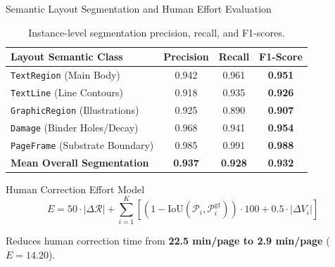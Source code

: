 \documentclass[aspectratio=169]{beamer}
\begin{document}
\begin{frame}{Semantic Layout Segmentation and Human Effort Evaluation}

\begin{table}
  \centering
  \small
  \setlength{\tabcolsep}{5pt}
  \begin{tabular}{lccc}
    \toprule
    \textbf{Layout Semantic Class} & \textbf{Precision} & \textbf{Recall} & \textbf{F1-Score} \\
    \midrule
    \texttt{TextRegion} (Main Body) & 0.942 & 0.961 & \textbf{0.951} \\
    \texttt{TextLine} (Line Contours) & 0.918 & 0.935 & \textbf{0.926} \\
    \texttt{GraphicRegion} (Illustrations) & 0.925 & 0.890 & \textbf{0.907} \\
    \texttt{Damage} (Binder Holes/Decay) & 0.968 & 0.941 & \textbf{0.954} \\
    \texttt{PageFrame} (Substrate Boundary) & 0.985 & 0.991 & \textbf{0.988} \\
    \midrule
    \textbf{Mean Overall Segmentation} & \textbf{0.937} & \textbf{0.928} & \textbf{0.932} \\
    \bottomrule
  \end{tabular}
  \caption{Instance-level segmentation precision, recall, and F1-scores.}
\end{table}

\vspace{-2mm}

\begin{block}{Human Correction Effort Model}
  \small
  \[
    E = 50 \cdot |\Delta \mathcal{R}| +
    \sum_{i=1}^K
    \left[
      (1-\text{IoU}(\mathcal{P}_i,\mathcal{P}_i^{\text{gt}}))\cdot100
      +0.5\cdot|\Delta V_i|
    \right]
  \]
  \vspace{-3mm}

  Reduces human correction time from
  \textbf{22.5 min/page to 2.9 min/page}
  \quad ($E=14.20$).
\end{block}

\end{frame}
\end{document}
